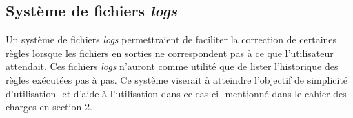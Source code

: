 	\subsection{Système de fichiers \textit{logs}}
	
		Un système de fichiers \textit{logs} permettraient de faciliter la correction de certaines règles lorsque les fichiers en sorties ne correspondent pas à ce que l'utilisateur attendait. Ces fichiers \textit{logs} n'auront comme utilité que de lister l'historique des règles exécutées pas à pas. Ce système viserait à atteindre l'objectif de simplicité d'utilisation -et d'aide à l'utilisation dans ce cas-ci- mentionné dans le cahier des charges en section 2.
